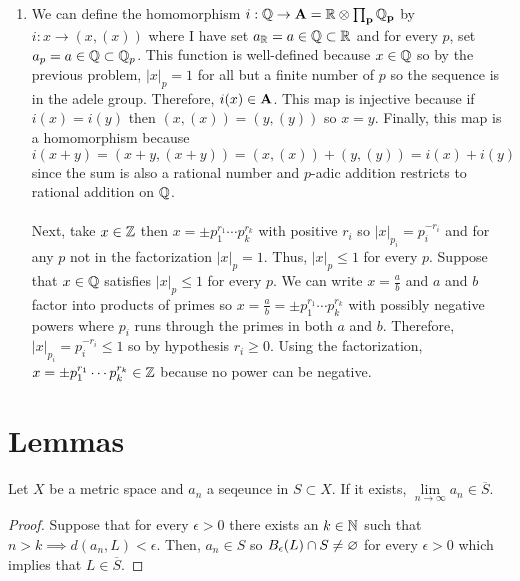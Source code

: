 \documentclass[12pt]{extarticle}
\begin{document}
\begin{enumerate}
\item We can define the homomorphism $i : \mathbb{Q} \to \bf{A} = \mathbb{R} \otimes \prod_{p} \mathbb{Q}_p$ by $i : x \to (x, (x))$ where I have set $a_{\mathbb{R}} = a \in \mathbb{Q} \subset \mathbb{R}$ and for every $p$, set  $a_p = a \in \mathbb{Q} \subset \mathbb{Q}_p$. This function is well-defined because $x \in \mathbb{Q}$ so by the previous problem, $|x|_p = 1$ for all but a finite number of $p$ so the sequence is in the adele group. Therefore, $i(x) \in \bf{A}$. This map is injective because if $i(x) = i(y)$ then $(x, (x)) = (y, (y))$ so $x = y$. Finally, this map is a homomorphism because $i(x + y) = (x + y, (x + y)) = (x, (x)) + (y, (y)) = i(x) + i(y)$ since the sum is also a rational number and $p$-adic addition restricts to rational addition on $\mathbb{Q}$. 
\\\\
Next, take $x \in \mathbb{Z}$ then $x = \pm p_1^{r_1} \cdots p_k^{r_k}$ with positive $r_i$ so $|x|_{p_i} = p_i^{-r_i}$ and for any $p$ not in the factorization $|x|_p = 1$. Thus, $|x|_p \le 1$ for every $p$. Suppose that  $x \in \mathbb{Q}$ satisfies $|x|_p \le 1$ for every $p$. We can write $x = \frac{a}{b}$ and $a$ and $b$ factor into products of primes so $x = \frac{a}{b} = \pm p_1^{r_1} \cdots p_k^{r_k}$ with possibly negative powers where $p_i$ runs through the primes in both $a$ and $b$. Therefore, $|x|_{p_i} = p_i^{-r_i} \le 1$ so by hypothesis $r_i \ge 0$. Using the factorization, $x = \pm p_1^{r_1} \cdots p_k^{r_k} \in \mathbb{Z}$ because no power can be negative. 

\end{enumerate}

\section*{Lemmas}

\begin{lemma} \label{seqs}
Let $X$ be a metric space and $a_n$ a seqeunce in $S \subset X$. If it exists, $\lim\limits_{n \to \infty} a_n \in \overline{S}$. 
\end{lemma}
\begin{proof}
Suppose that for every $\epsilon > 0$ there exists an $k \in \mathbb{N}$ such that $n > k \implies d(a_n, L)  < \epsilon$. Then, $a_n \in S$ so $B_{\epsilon} \! \left(L \right) \cap S \neq \varnothing$ for every $\epsilon > 0$ which implies that $L \in \overline{S}$. 
\end{proof}
\end{document}
